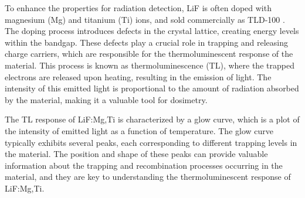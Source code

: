 \vspace{10pt}

To enhance the properties for radiation detection, LiF is often doped with magnesium (Mg) and titanium (Ti) ions, and sold commercially as TLD-100 \cite{lif}. The doping process introduces defects in the crystal lattice, creating energy levels within the bandgap. These defects play a crucial role in trapping and releasing charge carriers, which are responsible for the thermoluminescent response of the material. This process is known as thermoluminescence (TL), where the trapped electrons are released upon heating, resulting in the emission of light. The intensity of this emitted light is proportional to the amount of radiation absorbed by the material, making it a valuable tool for dosimetry.


\vspace{10pt}

The TL response of LiF:Mg,Ti is characterized by a glow curve, which is a plot of the intensity of emitted light as a function of temperature. The glow curve typically exhibits several peaks, each corresponding to different trapping levels in the material. The position and shape of these peaks can provide valuable information about the trapping and recombination processes occurring in the material, and they are key to understanding the thermoluminescent response of LiF:Mg,Ti. 


